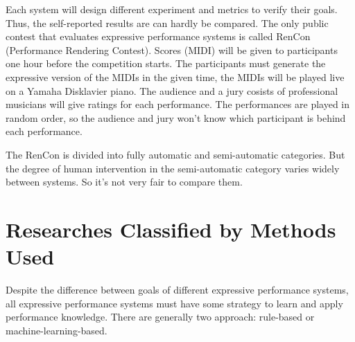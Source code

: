 Each system will design different experiment and metrics to verify their goals. Thus, the self-reported results are can hardly be compared. The only public contest that evaluates expressive performance systems is called RenCon (Performance Rendering Contest)\cite{RenCon}. Scores (MIDI) will be given to participants one hour before the competition starts. The participants must generate the expressive version of the MIDIs in the given time, the MIDIs will be played live on a Yamaha Disklavier piano. The audience and a jury cosists of professional musicians will give ratings for each performance. The performances are played in random order, so the audience and jury won't know which participant is behind each performance.

The RenCon is divided into fully automatic and semi-automatic categories. But the degree of human intervention in the semi-automatic category varies widely between systems. So it's not very fair to compare them.



\section{Researches Classified by Methods Used}
Despite the difference between goals of different expressive performance systems, all expressive performance systems must have some strategy to learn and apply performance knowledge. There are generally two approach: rule-based or machine-learning-based.

